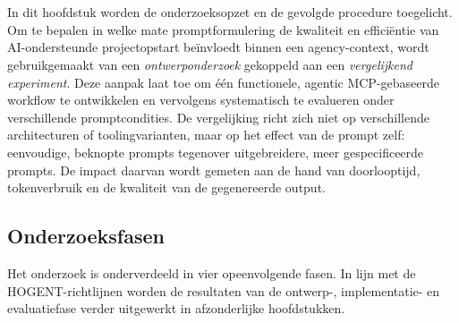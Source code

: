 \chapter{}
\label{ch:methodologie}

In dit hoofdstuk worden de onderzoeksopzet en de gevolgde procedure toegelicht.
Om te bepalen in welke mate promptformulering de kwaliteit en efficiëntie van AI-ondersteunde projectopstart beïnvloedt binnen een agency-context, wordt gebruikgemaakt van een \textit{ontwerponderzoek} gekoppeld aan een \textit{vergelijkend experiment}. Deze aanpak laat toe om één functionele, agentic MCP-gebaseerde workflow te ontwikkelen en vervolgens systematisch te evalueren onder verschillende promptcondities. De vergelijking richt zich niet op verschillende architecturen of toolingvarianten, maar op het effect van de prompt zelf: eenvoudige, beknopte prompts tegenover uitgebreidere, meer gespecificeerde prompts. De impact daarvan wordt gemeten aan de hand van doorlooptijd, tokenverbruik en de kwaliteit van de gegenereerde output.

\section{Onderzoeksfasen}
\label{sec:onderzoeksfasen}

Het onderzoek is onderverdeeld in vier opeenvolgende fasen. In lijn met de HOGENT-richtlijnen worden de resultaten van de ontwerp-, implementatie- en evaluatiefase verder uitgewerkt in afzonderlijke hoofdstukken.

